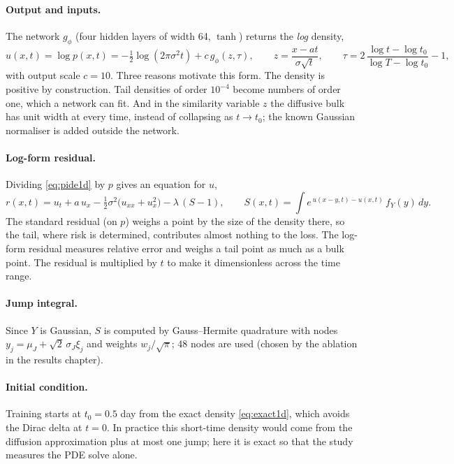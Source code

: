\paragraph{Output and inputs.} The network $g_\phi$ (four hidden layers of width 64, $\tanh$) returns the
\emph{log} density,
\begin{equation}
  u(x,t) = \log p(x,t) = -\tfrac12 \log(2\pi\sigma^2 t) + c\, g_\phi(z, \tau), \qquad
  z = \frac{x - a t}{\sigma\sqrt{t}}, \qquad
  \tau = 2\,\frac{\log t - \log t_0}{\log T - \log t_0} - 1,
  \label{eq:u1d}
\end{equation}
with output scale $c = 10$. Three reasons motivate this form. The density is positive by construction.
Tail densities of order $10^{-4}$ become numbers of order one, which a network can fit. And in the similarity
variable $z$ the diffusive bulk has unit width at every time, instead of collapsing as $t \to t_0$; the known
Gaussian normaliser is added outside the network.

\paragraph{Log-form residual.} Dividing \cref{eq:pide1d} by $p$ gives an equation for $u$,
\begin{equation}
  r(x,t) = u_t + a\,u_x - \tfrac12\sigma^2\big(u_{xx} + u_x^2\big) - \lambda\,(S - 1), \qquad
  S(x,t) = \int e^{\,u(x-y,t) - u(x,t)}\, f_Y(y)\,dy .
  \label{eq:logres}
\end{equation}
The standard residual (on $p$) weighs a point by the size of the density there, so the tail, where risk is
determined, contributes almost nothing to the loss. The log-form residual measures relative error and weighs a
tail point as much as a bulk point. The residual is multiplied by $t$ to make it dimensionless across the time
range.

\paragraph{Jump integral.} Since $Y$ is Gaussian, $S$ is computed by Gauss--Hermite quadrature with nodes
$y_j = \mu_J + \sqrt{2}\,\sigma_J \xi_j$ and weights $w_j/\sqrt{\pi}$; 48 nodes are used (chosen by the ablation
in the results chapter).

\paragraph{Initial condition.} Training starts at $t_0 = 0.5$ day from the exact density
\cref{eq:exact1d}, which avoids the Dirac delta at $t = 0$. In practice this short-time density would come from
the diffusion approximation plus at most one jump; here it is exact so that the study measures the PDE solve
alone.

